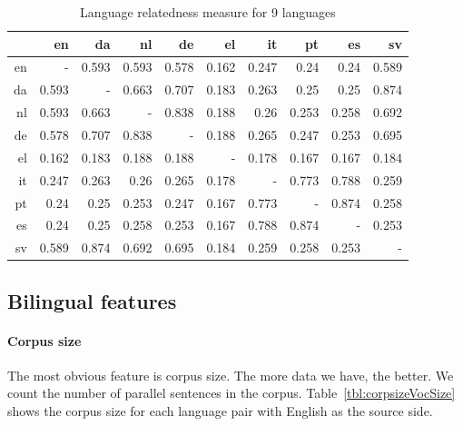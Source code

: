 \begin{table}[htbp]
  \centering
    \begin{tabular}{r|rrrrrrrrr}
          & en    & da    & nl    & de    & el    & it    & pt    & es    & sv \\\hline
    en    & -     & 0.593 & 0.593 & 0.578 & 0.162 & 0.247 & 0.24  & 0.24  & 0.589 \\
    da    & 0.593 & -     & 0.663 & 0.707 & 0.183 & 0.263 & 0.25  & 0.25  & 0.874 \\
    nl    & 0.593 & 0.663 & -     & 0.838 & 0.188 & 0.26  & 0.253 & 0.258 & 0.692 \\
    de    & 0.578 & 0.707 & 0.838 & -     & 0.188 & 0.265 & 0.247 & 0.253 & 0.695 \\
    el    & 0.162 & 0.183 & 0.188 & 0.188 & -     & 0.178 & 0.167 & 0.167 & 0.184 \\
    it    & 0.247 & 0.263 & 0.26  & 0.265 & 0.178 & -     & 0.773 & 0.788 & 0.259 \\
    pt    & 0.24  & 0.25  & 0.253 & 0.247 & 0.167 & 0.773 & -     & 0.874 & 0.258 \\
    es    & 0.24  & 0.25  & 0.258 & 0.253 & 0.167 & 0.788 & 0.874 & -     & 0.253 \\
    sv    & 0.589 & 0.874 & 0.692 & 0.695 & 0.184 & 0.259 & 0.258 & 0.253 & - \\

    \end{tabular}%
  \caption{Language relatedness measure for 9 languages}
  \label{tab:langRelatedNess9Lang}%
\end{table}%

\subsection{Bilingual features}


\paragraph{Corpus size}
The most obvious feature is corpus size. The more data we have, the better. We count the number of parallel sentences in the corpus.  Table~\ref{tbl:corpsizeVocSize} shows the corpus size for each language pair with English as the source side. 

